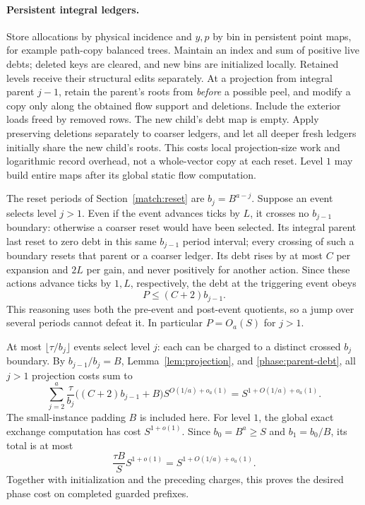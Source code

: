 \paragraph{Persistent integral ledgers.}
Store allocations by physical incidence and \(y,p\) by bin
in persistent point maps, for example path-copy balanced
trees.  Maintain an index and sum of positive live debts;
deleted keys are cleared, and new bins are initialized
locally.  Retained levels receive their structural edits
separately.  At a projection from integral parent \(j-1\),
retain the parent's roots from \emph{before} a possible
peel, and modify a copy only along the obtained flow support
and deletions.  Include the exterior loads freed by removed
rows.  The new child's debt map is empty.  Apply preserving
deletions separately to coarser ledgers, and let all deeper
fresh ledgers initially share the new child's roots.
This costs local projection-size work and logarithmic
record overhead, not a whole-vector copy at each reset.
Level \(1\) may build entire maps after its global static
flow computation.

The reset periods of Section~\ref{match:reset} are
\(b_j=B^{a-j}\).
Suppose an event selects level \(j>1\).  Even if the event
advances ticks by \(L\), it crosses no \(b_{j-1}\) boundary:
otherwise a coarser reset would have been selected.
Its integral parent last reset to zero debt in this same
\(b_{j-1}\) period interval; every crossing of such a
boundary resets that parent or a coarser ledger.
Its debt rises by at most \(C\) per expansion and \(2L\)
per gain, and never positively for another action.
Since these actions advance ticks by \(1,L\), respectively,
the debt at the triggering event obeys
\begin{equation}
\label{phase:parent-debt}
                              P\le(C+2)b_{j-1}.
\end{equation}
This reasoning uses both the pre-event and post-event
quotients, so a jump over several periods cannot defeat it.
In particular \(P=O_a(S)\) for \(j>1\).

At most \(\lfloor\tau/b_j\rfloor\) events select level \(j\):
each can be charged to a distinct crossed \(b_j\) boundary.
By \(b_{j-1}/b_j=B\), Lemma~\ref{lem:projection}, and
\eqref{phase:parent-debt}, all \(j>1\) projection costs sum to
\begin{equation}
\label{phase:local-reset-sum}
 \sum_{j=2}^a
   \frac{\tau}{b_j}\bigl((C+2)b_{j-1}+B\bigr)
                    S^{O(1/a)+o_a(1)}
       =S^{1+O(1/a)+o_a(1)} .
\end{equation}
The small-instance padding \(B\) is included here.
For level \(1\), the global exact exchange computation has
cost \(S^{1+o(1)}\).  Since
\(b_0=B^a\ge S\) and \(b_1=b_0/B\), its total is at most
\[
                  \frac{\tau B}{S}S^{1+o(1)}
                         =S^{1+O(1/a)+o_a(1)} .
\]
Together with initialization and the preceding charges,
this proves the desired phase cost on completed guarded
prefixes.

